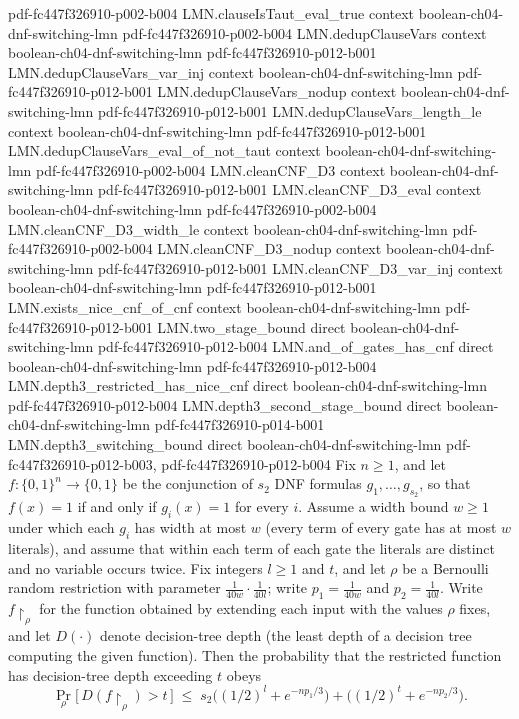 \begin{lemma}
  {pdf-fc447f326910-p002-b004}
\proofstep
  {LMN.clauseIsTaut_eval_true}
  {context}
  {boolean-ch04-dnf-switching-lmn}
  {pdf-fc447f326910-p002-b004}
\proofstep
  {LMN.dedupClauseVars}
  {context}
  {boolean-ch04-dnf-switching-lmn}
  {pdf-fc447f326910-p012-b001}
\proofstep
  {LMN.dedupClauseVars_var_inj}
  {context}
  {boolean-ch04-dnf-switching-lmn}
  {pdf-fc447f326910-p012-b001}
\proofstep
  {LMN.dedupClauseVars_nodup}
  {context}
  {boolean-ch04-dnf-switching-lmn}
  {pdf-fc447f326910-p012-b001}
\proofstep
  {LMN.dedupClauseVars_length_le}
  {context}
  {boolean-ch04-dnf-switching-lmn}
  {pdf-fc447f326910-p012-b001}
\proofstep
  {LMN.dedupClauseVars_eval_of_not_taut}
  {context}
  {boolean-ch04-dnf-switching-lmn}
  {pdf-fc447f326910-p002-b004}
\proofstep
  {LMN.cleanCNF_D3}
  {context}
  {boolean-ch04-dnf-switching-lmn}
  {pdf-fc447f326910-p012-b001}
\proofstep
  {LMN.cleanCNF_D3_eval}
  {context}
  {boolean-ch04-dnf-switching-lmn}
  {pdf-fc447f326910-p002-b004}
\proofstep
  {LMN.cleanCNF_D3_width_le}
  {context}
  {boolean-ch04-dnf-switching-lmn}
  {pdf-fc447f326910-p002-b004}
\proofstep
  {LMN.cleanCNF_D3_nodup}
  {context}
  {boolean-ch04-dnf-switching-lmn}
  {pdf-fc447f326910-p012-b001}
\proofstep
  {LMN.cleanCNF_D3_var_inj}
  {context}
  {boolean-ch04-dnf-switching-lmn}
  {pdf-fc447f326910-p012-b001}
\proofstep
  {LMN.exists_nice_cnf_of_cnf}
  {context}
  {boolean-ch04-dnf-switching-lmn}
  {pdf-fc447f326910-p012-b001}
\proofstep
  {LMN.two_stage_bound}
  {direct}
  {boolean-ch04-dnf-switching-lmn}
  {pdf-fc447f326910-p012-b004}
\proofstep
  {LMN.and_of_gates_has_cnf}
  {direct}
  {boolean-ch04-dnf-switching-lmn}
  {pdf-fc447f326910-p012-b004}
\proofstep
  {LMN.depth3_restricted_has_nice_cnf}
  {direct}
  {boolean-ch04-dnf-switching-lmn}
  {pdf-fc447f326910-p012-b004}
\proofstep
  {LMN.depth3_second_stage_bound}
  {direct}
  {boolean-ch04-dnf-switching-lmn}
  {pdf-fc447f326910-p014-b001}
\proofstep
  {LMN.depth3_switching_bound}
  {direct}
  {boolean-ch04-dnf-switching-lmn}
  {pdf-fc447f326910-p012-b003,
    pdf-fc447f326910-p012-b004}
Fix $n \ge 1$, and let $f\colon \{0,1\}^n \to \{0,1\}$ be the conjunction of $s_2$ DNF
formulas $g_1,\dots,g_{s_2}$, so that $f(x)=1$ if and only if $g_i(x)=1$ for every $i$.
Assume a width bound $w \ge 1$ under which each $g_i$ has width at most $w$ (every term
of every gate has at most $w$ literals), and assume that within each term of each gate
the literals are distinct and no variable occurs twice. Fix integers $l \ge 1$ and $t$,
and let $\rho$ be a Bernoulli random restriction with parameter
$\frac{1}{40w}\cdot\frac{1}{40l}$; write $p_1=\frac{1}{40w}$ and $p_2=\frac{1}{40l}$.
Write $f\!\restriction_\rho$ for the function obtained by extending each input with the
values $\rho$ fixes, and let $D(\cdot)$ denote decision-tree depth (the least depth of a
decision tree computing the given function). Then the probability that the restricted
function has decision-tree depth exceeding $t$ obeys
\[
\Pr_\rho\!\big[\,D(f\!\restriction_\rho) > t\,\big]
\;\le\; s_2\big((1/2)^{l} + e^{-n p_1/3}\big) + \big((1/2)^{t} + e^{-n p_2/3}\big).
\]
\end{lemma}

